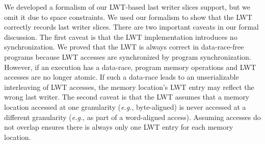 \documentclass[10pt,nocopyrightspace]{sigplanconf}
\newcommand{\lwt}{LWT\xspace}
\begin{document}
We developed a formalism of our \lwt-based last writer slices support, but we
omit it due to space constraints.  We used our formalism to show that the \lwt
correctly records last writer slices.  There are two important caveats in our
formal discussion.  The first caveat is that the \lwt implementation introduces
no synchronization.  We proved that the \lwt is always correct in
data-race-free programs because \lwt accesses are synchronized by program
synchronization.  However, if an execution has a data-race, program memory
operations and \lwt accesses are no longer atomic.  If such a data-race leads
to an unserializable interleaving of \lwt accesses, the memory location's \lwt
entry may reflect the wrong last writer.  The second caveat is that the \lwt
assumes that a memory location accessed at one granularity ({\em e.g.},
byte-aligned) is never accessed at a different granularity ({\em e.g.}, as part
of a word-aligned access).  Assuming accesses do not overlap ensures there is
always only one \lwt entry for each memory location.
\end{document}
